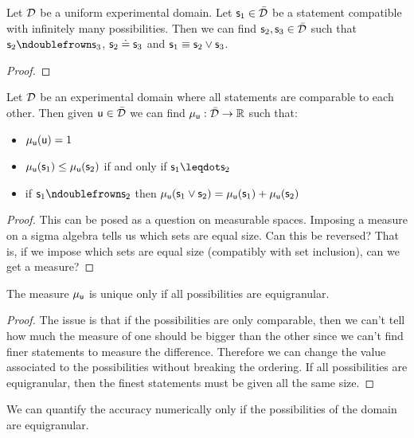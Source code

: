 \documentclass[11pt,letterpaper,fleqn]{memoir} %
\begin{document}
\begin{prop}
	Let $\edomain$ be a uniform experimental domain. Let $\stmt_1 \in \tdomain$ be a statement compatible with infinitely many possibilities. Then we can find $\stmt_2, \stmt_3 \in \tdomain$ such that $\stmt_2 \ncomp \stmt_3$, $\stmt_2 \eqgran \stmt_3$ and $\stmt_1 \equiv \stmt_2 \OR \stmt_3$.
\end{prop}

\begin{proof}
	
\end{proof}

\begin{thrm}
	Let $\edomain$ be an experimental domain where all statements are comparable to each other. Then given $\stmt[u] \in \tdomain$ we can find $\mu_{\stmt[u]} : \tdomain \to \mathbb{R}$ such that:
	\begin{itemize}
		\item $\mu_{\stmt[u]}(\stmt[u]) = 1$
		\item $\mu_{\stmt[u]}(\stmt_1) \leq \mu_{\stmt[u]}(\stmt_2)$ if and only if $\stmt_1 \finer \stmt_2$
		\item if $\stmt_1 \ncomp \stmt_2$ then $\mu_{\stmt[u]}(\stmt_1 \OR \stmt_2) =  \mu_{\stmt[u]}(\stmt_1) + \mu_{\stmt[u]}(\stmt_2)$
	\end{itemize}
\end{thrm}
\begin{proof}
	This can be posed as a question on measurable spaces. Imposing a measure on a sigma algebra tells us which sets are equal size. Can this be reversed? That is, if we impose which sets are equal size (compatibly with set inclusion), can we get a measure?
\end{proof}

\begin{coro}
	The measure $\mu_{\stmt[u]}$ is unique only if all possibilities are equigranular.
\end{coro}
\begin{proof}
	The issue is that if the possibilities are only comparable, then we can't tell how much the measure of one should be bigger than the other since we can't find finer statements to measure the difference. Therefore we can change the value associated to the possibilities without breaking the ordering. If all possibilities are equigranular, then the finest statements must be given all the same size.
\end{proof}

We can quantify the accuracy numerically only if the possibilities of the domain are equigranular.
\end{document}

